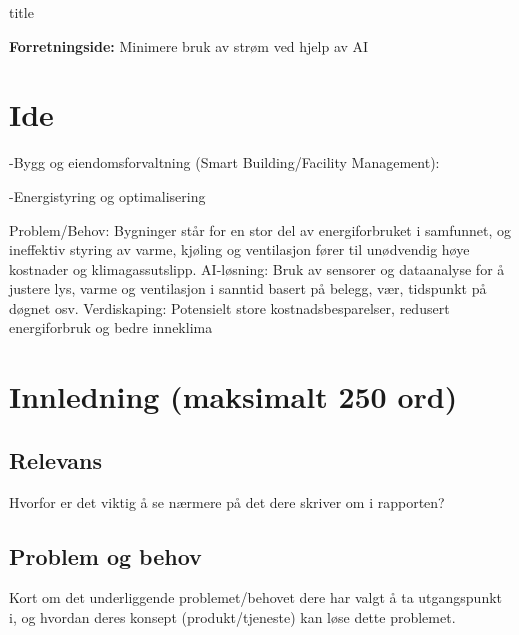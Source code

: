 \documentclass{article}
\begin{document}
{title}

\frontmatter

\tableofcontents

\listoffigures
\listoftables

\mainmatter





\textbf{Forretningside:}
Minimere bruk av strøm ved hjelp av AI


\newpage
\printbibliography[heading = bibintoc, title = Bibliography]    %


\section{Ide}
-Bygg og eiendomsforvaltning (Smart Building/Facility Management):

-Energistyring og optimalisering

Problem/Behov: Bygninger står for en stor del av energiforbruket i samfunnet, og ineffektiv styring av varme, kjøling og ventilasjon fører til unødvendig høye kostnader og klimagassutslipp.
AI-løsning: Bruk av sensorer og dataanalyse for å justere lys, varme og ventilasjon i sanntid basert på belegg, vær, tidspunkt på døgnet osv.
Verdiskaping: Potensielt store kostnadsbesparelser, redusert energiforbruk og bedre inneklima


\section{Innledning (maksimalt 250 ord)}
\subsection*{Relevans}
Hvorfor er det viktig å se nærmere på det dere skriver om i rapporten?

\subsection*{Problem og behov}
Kort om det underliggende problemet/behovet dere har valgt å ta utgangspunkt i, og hvordan deres konsept (produkt/tjeneste) kan løse dette problemet.
\end{document}
